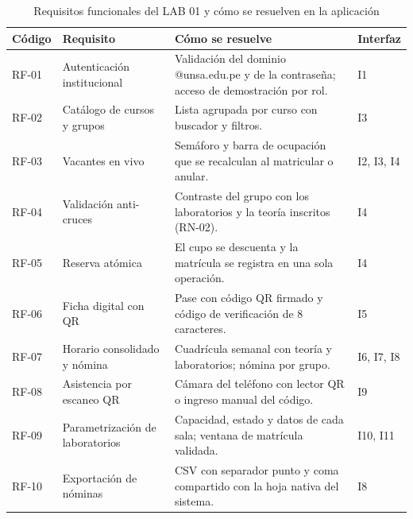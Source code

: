 \begin{table}[H]
\centering\small
\caption{Requisitos funcionales del LAB 01 y cómo se resuelven en la aplicación}\label{tab:rf}
\renewcommand{\arraystretch}{1.25}
\begin{tabular}{|>{\raggedright\arraybackslash}p{}|>{\raggedright\arraybackslash}p{}|>{\raggedright\arraybackslash}p{}|>{\raggedright\arraybackslash}p{}|}
\hline
\rowcolor{colabpyblue} \color{white}\textbf{Código} & \color{white}\textbf{Requisito} & \color{white}\textbf{Cómo se resuelve} & \color{white}\textbf{Interfaz} \\ \hline
RF-01 & Autenticación institucional & Validación del dominio @unsa.edu.pe y de la contraseña; acceso de demostración por rol. & I1 \\ \hline
\rowcolor{colabpybg} RF-02 & Catálogo de cursos y grupos & Lista agrupada por curso con buscador y filtros. & I3 \\ \hline
RF-03 & Vacantes en vivo & Semáforo y barra de ocupación que se recalculan al matricular o anular. & I2, I3, I4 \\ \hline
\rowcolor{colabpybg} RF-04 & Validación anti-cruces & Contraste del grupo con los laboratorios y la teoría inscritos (RN-02). & I4 \\ \hline
RF-05 & Reserva atómica & El cupo se descuenta y la matrícula se registra en una sola operación. & I4 \\ \hline
\rowcolor{colabpybg} RF-06 & Ficha digital con QR & Pase con código QR firmado y código de verificación de 8 caracteres. & I5 \\ \hline
RF-07 & Horario consolidado y nómina & Cuadrícula semanal con teoría y laboratorios; nómina por grupo. & I6, I7, I8 \\ \hline
\rowcolor{colabpybg} RF-08 & Asistencia por escaneo QR & Cámara del teléfono con lector QR o ingreso manual del código. & I9 \\ \hline
RF-09 & Parametrización de laboratorios & Capacidad, estado y datos de cada sala; ventana de matrícula validada. & I10, I11 \\ \hline
\rowcolor{colabpybg} RF-10 & Exportación de nóminas & CSV con separador punto y coma compartido con la hoja nativa del sistema. & I8 \\ \hline
\end{tabular}
\end{table}

